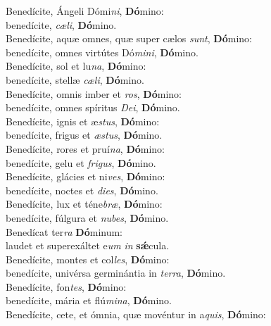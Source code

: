\evenverse Benedícite, Ángeli Dómi\textit{ni}, \textbf{Dó}mino:~\*\\
\evenverse benedícite, \textit{cæ}\textit{li}, \textbf{Dó}mino.\\
\oddverse Benedícite, aquæ omnes, quæ super cælos \textit{sunt}, \textbf{Dó}mino:~\*\\
\oddverse benedícite, omnes virtútes Dó\textit{mi}\textit{ni}, \textbf{Dó}mino.\\
\evenverse Benedícite, sol et lu\textit{na}, \textbf{Dó}mino:~\*\\
\evenverse benedícite, stellæ \textit{cæ}\textit{li}, \textbf{Dó}mino.\\
\oddverse Benedícite, omnis imber et \textit{ros}, \textbf{Dó}mino:~\*\\
\oddverse benedícite, omnes spíritus \textit{De}\textit{i}, \textbf{Dó}mino.\\
\evenverse Benedícite, ignis et æ\textit{stus}, \textbf{Dó}mino:~\*\\
\evenverse benedícite, frigus et \textit{æ}\textit{stus}, \textbf{Dó}mino.\\
\oddverse Benedícite, rores et pruí\textit{na}, \textbf{Dó}mino:~\*\\
\oddverse benedícite, gelu et \textit{fri}\textit{gus}, \textbf{Dó}mino.\\
\evenverse Benedícite, glácies et ni\textit{ves}, \textbf{Dó}mino:~\*\\
\evenverse benedícite, noctes et \textit{di}\textit{es}, \textbf{Dó}mino.\\
\oddverse Benedícite, lux et téne\textit{bræ}, \textbf{Dó}mino:~\*\\
\oddverse benedícite, fúlgura et \textit{nu}\textit{bes}, \textbf{Dó}mino.\\
\evenverse Benedícat ter\textit{ra} \textbf{Dó}minum:~\*\\
\evenverse laudet et superexáltet e\textit{um} \textit{in} \textbf{sǽ}cula.\\
\oddverse Benedícite, montes et col\textit{les}, \textbf{Dó}mino:~\*\\
\oddverse benedícite, univérsa germinántia in \textit{ter}\textit{ra}, \textbf{Dó}mino.\\
\evenverse Benedícite, fon\textit{tes}, \textbf{Dó}mino:~\*\\
\evenverse benedícite, mária et flú\textit{mi}\textit{na}, \textbf{Dó}mino.\\
\oddverse Benedícite, cete, et ómnia, quæ movéntur in a\textit{quis}, \textbf{Dó}mino:~\*\\
